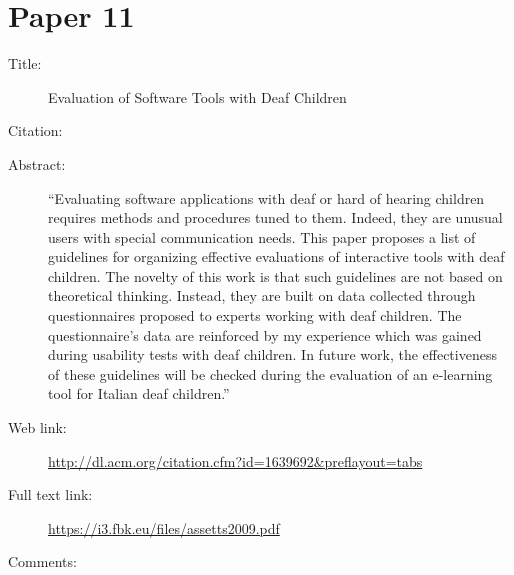\documentclass{scrartcl}
\begin{document}
\section*{Paper 11}
\begin{description}
\item[Title:] Evaluation of Software Tools with Deaf Children
\item[Citation:] \cite{Mich}
\item[Abstract:] ``Evaluating software applications with deaf or hard of hearing children requires methods and procedures tuned to them. Indeed, they are unusual users with special communication needs. This paper proposes a list of guidelines for organizing effective evaluations of interactive tools with deaf children. The novelty of this work is that such guidelines are not based on theoretical thinking. Instead, they are built on data collected through questionnaires proposed to experts working with deaf children. The questionnaire's data are reinforced by my experience which was gained during usability tests with deaf children. In future work, the effectiveness of these guidelines will be checked during the evaluation of an e-learning tool for Italian deaf children.''
\item[Web link:] \url {http://dl.acm.org/citation.cfm?id=1639692&preflayout=tabs}
\item[Full text link:] \url {https://i3.fbk.eu/files/assetts2009.pdf}
\item[Comments:]
\end{description}



\end{document}
